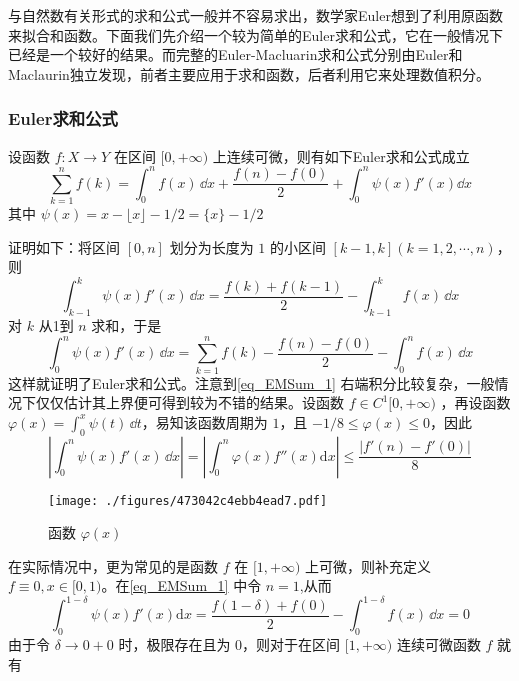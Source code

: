 
与自然数有关形式的求和公式一般并不容易求出，数学家Euler想到了利用原函数来拟合和函数。下面我们先介绍一个较为简单的Euler求和公式，它在一般情况下已经是一个较好的结果。而完整的Euler-Macluarin求和公式分别由Euler和Maclaurin独立发现，前者主要应用于求和函数，后者利用它来处理数值积分。

\subsubsection{Euler求和公式}

\begin{theorem}{}
设函数 $f:X\to Y$ 在区间 $[0,+\infty)$ 上连续可微，则有如下Euler求和公式成立	
        \begin{equation}\label{eq_EMSum_1} 
            \sum_{k=1}^{n}f(k)=\int_{0}^{n}f(x)\,\dd x
            +\frac{f(n)-f(0)}{2}+\int_{0}^{n}\psi(x)f'(x)\dd x
        \end{equation}
    其中 $\psi(x)=x-\lfloor x \rfloor-1/2=\{x\}-1/2$
\end{theorem}
证明如下：将区间 $[0,n]$ 划分为长度为 $1$ 的小区间 $[k-1,k](k=1,2,\cdots,n)$，则
​\[
    \int_{k-1}^{k}\psi(x)f'(x)\,\dd x
    =\frac{f(k)+f(k-1)}{2}-\int_{k-1}^{k}f(x)\,\dd x
\]
​对 $k$ 从1到 $n$ 求和，于是
​\[
    \int_{0}^{n}\psi(x)f'(x)\,\dd x
    =\sum_{k=1}^{n}f(k)-\frac{f(n)-f(0)}{2}-\int_{0}^{n}f(x)\,\dd x
\]
这样就证明了Euler求和公式。注意到\autoref{eq_EMSum_1}  右端积分比较复杂，一般情况下仅仅估计其上界便可得到较为不错的结果。设函数 $f\in{C^1[0,+\infty)}$ ，再设函数 $\varphi(x)=\displaystyle{\int_{0}^{x}\psi(t)\,\dd t}$，易知该函数周期为 $1$，且
 $-1/8\leqslant\varphi(x)\leqslant 0$，因此
\[
    \left|\int_{0}^{n}\psi(x)f'(x)\,\dd x\right|
    =\left|\int_{0}^{n}\varphi(x)f''(x)\mathrm{d}x\right|
    \leqslant\frac{|f'(n)-f'(0)|}{8}
\]
\begin{figure}[ht]
\centering
\texttt{[image: ./figures/473042c4ebb4ead7.pdf]}
\caption{函数 $\varphi(x)$} \label{fig_EMSum_1}
\end{figure}
在实际情况中，更为常见的是函数 $f$ 在 $[1,+\infty)$ 上可微，则补充定义 $ f\equiv 0,x\in[0,1)$。在\autoref{eq_EMSum_1}  中令 $n=1$,从而
\[
    \int_{0}^{1-\delta}\psi(x)f'(x)\mathrm{d}x
    =\frac{f(1-\delta)+f(0)}{2}-\int_{0}^{1-\delta}f(x)\,\dd x=0
\]
由于令 $\delta\to0+0$ 时，极限存在且为 $0$，则对于在区间 $[1,+\infty)$ 连续可微函数 $f$ 就有
